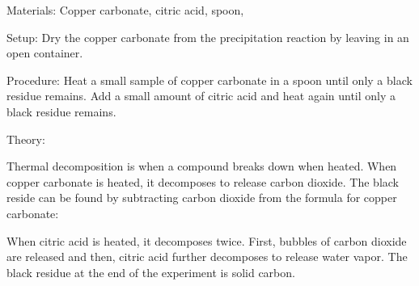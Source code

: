 \begin{multicols}{2}
\begin{description*}
\item[Materials:]{Copper carbonate, citric acid, spoon, }
\item[Setup:]{Dry the copper carbonate from the precipitation reaction by leaving in an open container.}
\item[Procedure:]{Heat a small sample of copper carbonate in a spoon until only a black residue remains. Add a small amount of citric acid and heat again until only a black residue remains.}
\item[Theory:]{Thermal decomposition is when a compound breaks down when heated. When copper carbonate is heated, it decomposes to release carbon dioxide. The black reside can be found by subtracting carbon dioxide from the formula for copper carbonate:
\begin{center}
\end{center}
When citric acid is heated, it decomposes twice. First, bubbles of carbon
dioxide are released and then, citric acid further decomposes to release water
vapor. The black residue at the end of the experiment is solid carbon.}
\end{description*}



\end{multicols}

\pagebreak